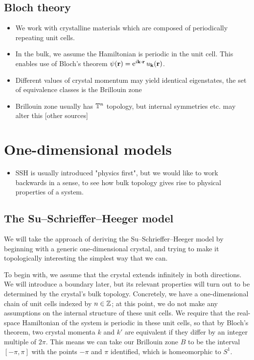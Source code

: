 \subsection{Bloch theory}\label{subsection:bloch}
{\color{blue}
\begin{itemize}
	\item We work with crystalline materials which are composed of periodically repeating unit cells.
	
	\item In the bulk, we assume the Hamiltonian is periodic in the unit cell. This enables use of Bloch's theorem\cite{Bloch_theorem} $\psi(\vb{r}) = \operatorname{e}^{i\vb{k}\cdot\vb{r}}u_{\vb{k}}(\vb{r})$.
	
	\item Different values of crystal momentum may yield identical eigenstates, the set of equivalence classes is the Brillouin zone
	
	\item Brillouin zone usually has $\mathbb{T}^n$ topology, but internal symmetries etc. may alter this\cite{Foncesca-Vaidya_nonorientable} [other sources]
\end{itemize}
}


\section{One-dimensional models}
{\color{blue}
\begin{itemize}
	\item SSH is usually introduced "physics first", but we would like to work backwards in a sense, to see how bulk topology gives rise to physical properties of a system.
\end{itemize}
}

\subsection{The Su--Schrieffer--Heeger model}
We will take the approach of deriving the Su--Schrieffer--Heeger model by beginning with a generic one-dimensional crystal, and trying to make it topologically interesting the simplest way that we can.

To begin with, we assume that the crystal extends infinitely in both directions. We will introduce a boundary later, but its relevant properties will turn out to be determined by the crystal's bulk topology. Concretely, we have a one-dimensional chain of unit cells indexed by $n\in\mathbb{Z}$; at this point, we do not make any assumptions on the internal structure of these unit cells. We require that the real-space Hamiltonian of the system is periodic in these unit cells, so that by Bloch's theorem, two crystal momenta $k$ and $k'$ are equivalent if they differ by an integer multiple of $2\pi$. This means we can take our Brillouin zone $B$ to be the interval $[-\pi,\pi]$ with the points $-\pi$ and $\pi$ identified, which is homeomorphic to $S^1$.

